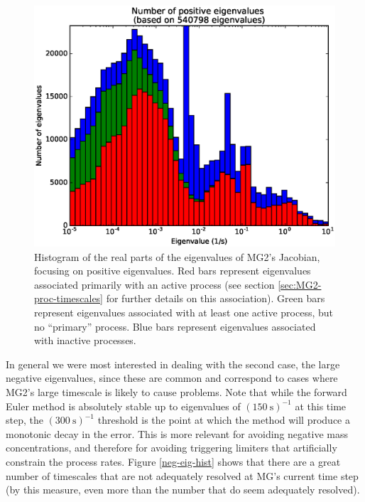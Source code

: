 \documentclass [11pt, proquest] {uwthesis}[2020/02/24]
\begin{document}
\begin{figure}[htbp]
  \includegraphics[width=6.5in]{./time_hist_all_values_pos.eps}
  \caption[Histogram of the positive eigenvalues of the Jacobian of MG2]{Histogram of the real parts of the eigenvalues of MG2's Jacobian, focusing on positive eigenvalues. Red bars represent eigenvalues associated primarily with an active process (see section \ref{sec:MG2-proc-timescales} for further details on this association). Green bars represent eigenvalues associated with at least one active process, but no ``primary'' process. Blue bars represent eigenvalues associated with inactive processes.}
  \label{pos-eig-hist}
\end{figure}

In general we were most interested in dealing with the second case, the large negative eigenvalues, since these are common and correspond to cases where MG2's large timescale is likely to cause problems. Note that while the forward Euler method is absolutely stable up to eigenvalues of $(\SI{150}{\second})^{-1}$ at this time step, the $(\SI{300}{\second})^{-1}$ threshold is the point at which the method will produce a monotonic decay in the error. This is more relevant for avoiding negative mass concentrations, and therefore for avoiding triggering limiters that artificially constrain the process rates. Figure \ref{neg-eig-hist} shows that there are a great number of timescales that are not adequately resolved at MG's current time step (by this measure, even more than the number that do seem adequately resolved).
\end{document}
